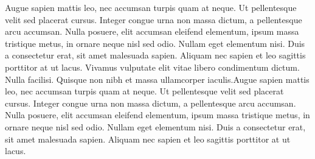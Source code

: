 \documentclass[../main.tex]{subfiles}
\begin{document}
Augue sapien mattis leo, nec accumsan turpis quam at neque. Ut pellentesque velit sed placerat cursus. Integer congue urna non massa dictum, a pellentesque arcu accumsan. Nulla posuere, elit accumsan eleifend elementum, ipsum massa tristique metus, in ornare neque nisl sed odio. Nullam eget elementum nisi. Duis a consectetur erat, sit amet malesuada sapien. Aliquam nec sapien et leo sagittis porttitor at ut lacus. Vivamus vulputate elit vitae libero condimentum dictum. Nulla facilisi. Quisque non nibh et massa ullamcorper iaculis.Augue sapien mattis leo, nec accumsan turpis quam at neque. Ut pellentesque velit sed placerat cursus. Integer congue urna non massa dictum, a pellentesque arcu accumsan. Nulla posuere, elit accumsan eleifend elementum, ipsum massa tristique metus, in ornare neque nisl sed odio. Nullam eget elementum nisi. Duis a consectetur erat, sit amet malesuada sapien. Aliquam nec sapien et leo sagittis porttitor at ut lacus. 
\end{document}

